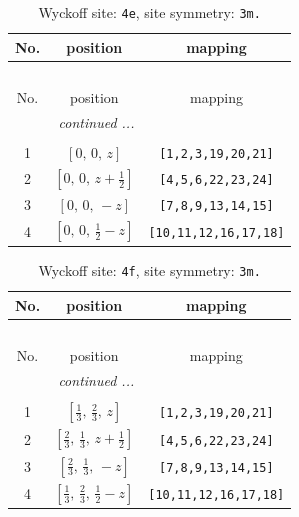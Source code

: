 \documentclass[fleqn,8pt]{jsarticle}
\begin{document}
\begin{longtable}{ccc}
\caption{Wyckoff site: {\tt 4e}, site symmetry: {\tt 3m.}}
 \\
 \hline \hline
No. & position & mapping \\ \hline \endfirsthead

\multicolumn{2}{l}{\tablename\ \thetable{}} \\
 \hline \hline
No. & position & mapping \\ \hline \endhead

 \hline \hline
\multicolumn{2}{r}{\footnotesize\it continued ...} \\ \endfoot

 \hline \hline
\multicolumn{2}{r}{} \\ \endlastfoot

1 & $\left[ 0,\, 0,\, z \right]$ & {\tt [1,2,3,19,20,21]} \\ \hline
2 & $\left[ 0,\, 0,\, z + \frac{1}{2} \right]$ & {\tt [4,5,6,22,23,24]} \\ \hline
3 & $\left[ 0,\, 0,\, - z \right]$ & {\tt [7,8,9,13,14,15]} \\ \hline
4 & $\left[ 0,\, 0,\, \frac{1}{2} - z \right]$ & {\tt [10,11,12,16,17,18]} \\
\end{longtable}
\renewcommand{\arraystretch}{1.2}
\begin{longtable}{ccc}
\caption{Wyckoff site: {\tt 4f}, site symmetry: {\tt 3m.}}
 \\
 \hline \hline
No. & position & mapping \\ \hline \endfirsthead

\multicolumn{2}{l}{\tablename\ \thetable{}} \\
 \hline \hline
No. & position & mapping \\ \hline \endhead

 \hline \hline
\multicolumn{2}{r}{\footnotesize\it continued ...} \\ \endfoot

 \hline \hline
\multicolumn{2}{r}{} \\ \endlastfoot

1 & $\left[ \frac{1}{3},\, \frac{2}{3},\, z \right]$ & {\tt [1,2,3,19,20,21]} \\ \hline
2 & $\left[ \frac{2}{3},\, \frac{1}{3},\, z + \frac{1}{2} \right]$ & {\tt [4,5,6,22,23,24]} \\ \hline
3 & $\left[ \frac{2}{3},\, \frac{1}{3},\, - z \right]$ & {\tt [7,8,9,13,14,15]} \\ \hline
4 & $\left[ \frac{1}{3},\, \frac{2}{3},\, \frac{1}{2} - z \right]$ & {\tt [10,11,12,16,17,18]} \\
\end{longtable}
\end{document}
